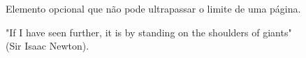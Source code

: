 \begin{agradecimentos}
    Elemento opcional que não pode ultrapassar o limite de uma página.
\end{agradecimentos}

\begin{epigrafe}
    \vspace*{\fill}
	\begin{flushright}
        		"If I have seen further, it is by standing on the shoulders of giants"\\(Sir Isaac Newton).
	\end{flushright}
\end{epigrafe}

